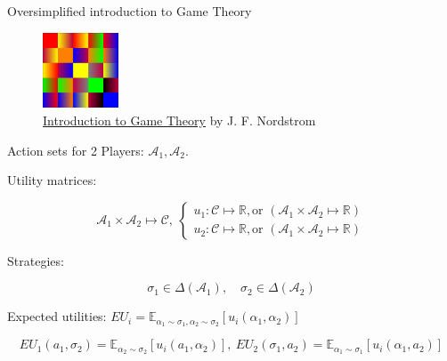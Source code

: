 \documentclass{beamer}
\theoremstyle{definition}
\begin{document}
\begin{frame}{Oversimplified introduction to Game Theory}

\begin{figure}
    \centering
    \includegraphics[width=0.2\textwidth]{img/GameTheoryLogo.png}
    \caption{\tiny \centering \href{https://nordstrommath.com/IntroGameTheoryv4-2020.pdf}{Introduction to Game Theory} by J. F. Nordstrom}
\end{figure}

Action sets for 2 Players: $\mathcal{A}_1, \mathcal{A}_2$.

Utility matrices:

\[
    \mathcal{A}_1 \times \mathcal{A}_2 \mapsto \mathcal{C}, \ 
    \begin{cases}
    u_1 : \mathcal{C} \mapsto \mathbb{R}, \text{or } (\mathcal{A}_1 \times \mathcal{A}_2 \mapsto \mathbb{R}) \\
    u_2 : \mathcal{C} \mapsto \mathbb{R}, \text{or } (\mathcal{A}_1 \times \mathcal{A}_2 \mapsto \mathbb{R})
\end{cases}
\]

Strategies:

\[
\sigma_1 \in \Delta(\mathcal{A}_1), \quad
\sigma_2 \in \Delta(\mathcal{A}_2)
\]

Expected utilities: $EU_i = \mathbb{E}_{\alpha_1 \sim \sigma_1, \alpha_2 \sim \sigma_2}[u_i(\alpha_1,\alpha_2)]$

\[
EU_1(a_1,\sigma_2) = \mathbb{E}_{\alpha_2 \sim \sigma_2}[u_i(a_1,\alpha_2)], \ 
EU_2(\sigma_1,a_2) = \mathbb{E}_{\alpha_1 \sim \sigma_1}[u_i(\alpha_1,a_2)]
\]

\end{frame}
\end{document}
